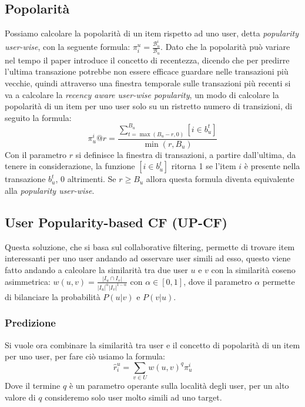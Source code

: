 \subsection{Popolarità}
Possiamo calcolare la popolarità di un item rispetto ad uno user, detta \textit{popularity user-wise}, con la seguente formula: $\pi_{i}^{u} = \frac{\mathcal{B}_{u}^{i}}{\mathcal{B}_{u}}$.
Dato che la popolarità può variare nel tempo il paper introduce il concetto di recentezza, dicendo che per predirre l'ultima transazione potrebbe non essere efficace guardare nelle transazioni più vecchie, quindi attraverso una finestra temporale sulle transazioni più recenti si va a calcolare la \textit{recency aware user-wise popularity}, un modo di calcolare la popolarità di un item per uno user solo su un ristretto numero di transizioni, di seguito la formula: 
$$\pi_{u}^{i}@r = \frac{\sum_{t = \max (B_{u}-r,0)}^{B_{u}}[i \in b_{u}^{t}]}{\min(r,B_{u})}$$
Con il parametro $r$ si definisce la finestra di transazioni, a partire dall'ultima, da tenere in considerazione, la funzione $[i \in b_{u}^{t}]$ ritorna 1 se l'item $i$ è presente nella transazione $b_{u}^{t}$, 0 altrimenti. Se $r \geqslant B_{u}$ allora questa formula diventa equivalente alla \textit{popularity user-wise}.
\subsection{User Popularity-based CF (UP-CF)}
Questa soluzione, che si basa sul collaborative filtering, permette di trovare item interessanti per uno user andando ad osservare user simili ad esso, questo viene fatto andando a calcolare la similarità tra due user $u$ e $v$ con la similarità coseno asimmetrica: $w(u,v) = \frac{|I_u \cap I_v|}{|I_u|^{\alpha}|I_v|^{1-\alpha}}$ con $\alpha \in [0,1]$, dove il parametro $\alpha$ permette di bilanciare la probabilità $P(u|v)$ e $P(v|u)$. 
\subsubsection{Predizione}
Si vuole ora combinare la similarità tra user e il concetto di popolarità di un item per uno user, per fare ciò usiamo la formula: 
$$\hat{r}_{i}^{u} = \sum_{v \in U} w(u,v)^{q}\pi_{u}^{i}$$
Dove il termine $q$ è un parametro operante sulla località degli user, per un alto valore di $q$ consideremo solo user molto simili ad uno target.
